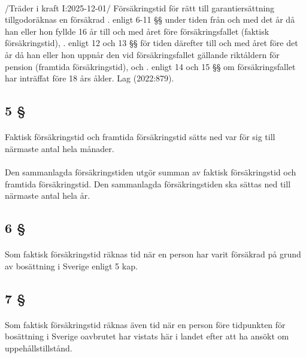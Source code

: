 \documentclass[a4paper,notitlepage,openany,10pt]{book}
\begin{document}
\paragraph*{}
/Träder i kraft I:2025-12-01/
Försäkringstid för rätt till garantiersättning tillgodoräknas en försäkrad
. enligt 6-11 §§ under tiden från och med det år då han eller hon fyllde 16 år till och med året före försäkringsfallet (faktisk försäkringstid),
. enligt 12 och 13 §§ för tiden därefter till och med året före det år då han eller hon uppnår den vid försäkringsfallet gällande riktåldern för pension (framtida försäkringstid), och
. enligt 14 och 15 §§ om försäkringsfallet har inträffat före 18 års ålder.
Lag (2022:879).
\subsection*{5 §}
\paragraph*{}
Faktisk försäkringstid och framtida försäkringstid sätts ned var för sig till närmaste antal hela månader.
\paragraph*{}
Den sammanlagda försäkringstiden utgör summan av faktisk försäkringstid och framtida försäkringstid. Den sammanlagda försäkringstiden ska sättas ned till närmaste antal hela år.
\subsection*{6 §}
\paragraph*{}
Som faktisk försäkringstid räknas tid när en person har varit försäkrad på grund av bosättning i Sverige enligt 5 kap.
\subsection*{7 §}
\paragraph*{}
Som faktisk försäkringstid räknas även tid när en person före tidpunkten för bosättning i Sverige oavbrutet har vistats här i landet efter att ha ansökt om uppehållstillstånd.
\end{document}
